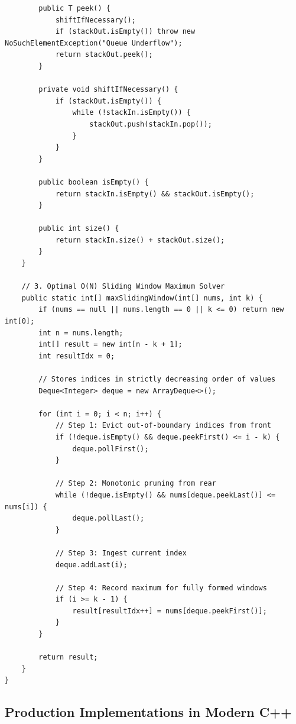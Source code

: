 \documentclass[10pt,journal,compsoc,onecolumn]{IEEEtran}
\begin{document}
\begin{verbatim}
        public T peek() {
            shiftIfNecessary();
            if (stackOut.isEmpty()) throw new NoSuchElementException("Queue Underflow");
            return stackOut.peek();
        }

        private void shiftIfNecessary() {
            if (stackOut.isEmpty()) {
                while (!stackIn.isEmpty()) {
                    stackOut.push(stackIn.pop());
                }
            }
        }

        public boolean isEmpty() {
            return stackIn.isEmpty() && stackOut.isEmpty();
        }

        public int size() {
            return stackIn.size() + stackOut.size();
        }
    }

    // 3. Optimal O(N) Sliding Window Maximum Solver
    public static int[] maxSlidingWindow(int[] nums, int k) {
        if (nums == null || nums.length == 0 || k <= 0) return new int[0];
        int n = nums.length;
        int[] result = new int[n - k + 1];
        int resultIdx = 0;

        // Stores indices in strictly decreasing order of values
        Deque<Integer> deque = new ArrayDeque<>();

        for (int i = 0; i < n; i++) {
            // Step 1: Evict out-of-boundary indices from front
            if (!deque.isEmpty() && deque.peekFirst() <= i - k) {
                deque.pollFirst();
            }

            // Step 2: Monotonic pruning from rear
            while (!deque.isEmpty() && nums[deque.peekLast()] <= nums[i]) {
                deque.pollLast();
            }

            // Step 3: Ingest current index
            deque.addLast(i);

            // Step 4: Record maximum for fully formed windows
            if (i >= k - 1) {
                result[resultIdx++] = nums[deque.peekFirst()];
            }
        }

        return result;
    }
}
\end{verbatim}

\subsection{Production Implementations in Modern C++}
\end{document}
